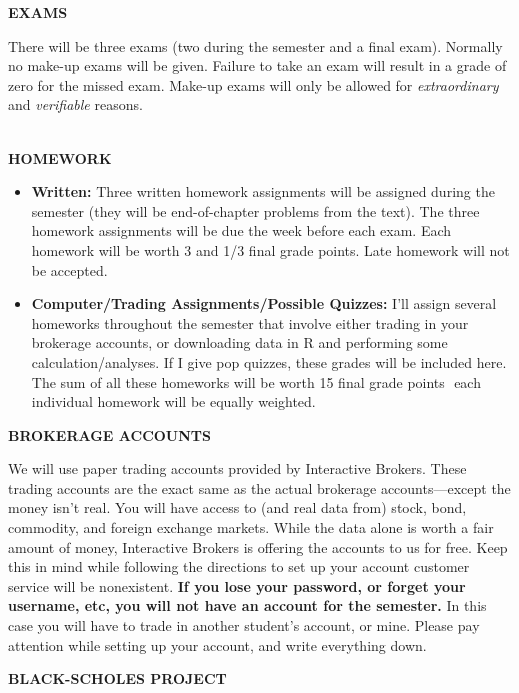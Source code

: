 \documentclass{article}
\begin{document}
\vspace*{7pt}
\begin{center}
{\bf EXAMS} 
\end{center}
There will be three exams (two during the semester and a final exam). Normally no make-up exams will be given.  Failure to take an exam will result in a grade of zero for the missed exam.  Make-up exams will only be allowed for {\it extraordinary} and {\it verifiable} reasons.\\
\\
\begin{center}
{\bf HOMEWORK} 
\end{center}
\begin{itemize}
\item {\bf Written:} Three written homework assignments will be assigned during the semester (they will be
end-of-chapter problems from the text). The three homework assignments will be due the week before
each exam. Each homework will be worth 3 and 1/3 final grade points. Late homework will not be
accepted.
%
\item {\bf Computer/Trading Assignments/Possible Quizzes:} I'll assign several homeworks throughout the
semester that involve either trading in your brokerage accounts, or downloading data in R and
performing some calculation/analyses. If I give pop quizzes, these grades will be included here. The
sum of all these homeworks will be worth 15 final grade points ­ each individual homework will be
equally weighted.
\end{itemize}
\vspace*{5pt}
\begin{center}
{\bf BROKERAGE ACCOUNTS} 
\end{center}
We will use paper trading accounts provided by Interactive Brokers. These
trading accounts are the exact same as the actual brokerage accounts---except the money isn’t real.
You will have access to (and real data from) stock, bond, commodity, and foreign exchange markets.
While the data alone is worth a fair amount of money, Interactive Brokers is offering the accounts to us
for free. Keep this in mind while following the directions to set up your account customer service will
be nonexistent. {\bf If you lose your password, or forget your username, etc, you will not have an
account for the semester.} In this case you will have to trade in another student’s account, or mine.
Please pay attention while setting up your account, and write everything down.
\vspace*{5pt}
\begin{center}
{\bf BLACK-SCHOLES PROJECT}
\end{center}
\end{document}
